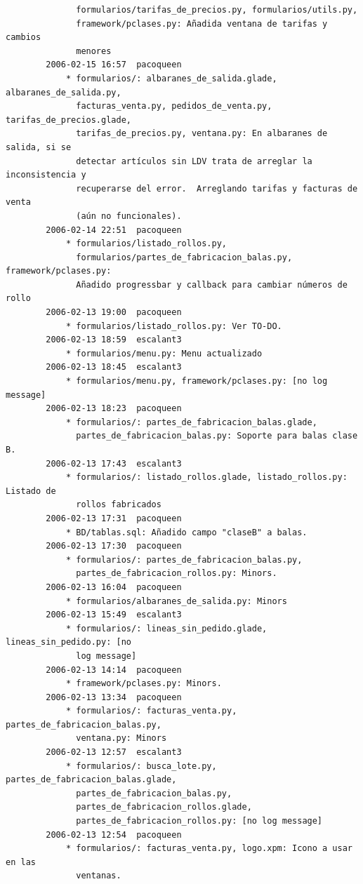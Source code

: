\documentclass[a4paper]{article}
\begin{document}
\begin{verbatim}
              formularios/tarifas_de_precios.py, formularios/utils.py,
              framework/pclases.py: Añadida ventana de tarifas y cambios
              menores
        2006-02-15 16:57  pacoqueen
            * formularios/: albaranes_de_salida.glade, albaranes_de_salida.py,
              facturas_venta.py, pedidos_de_venta.py, tarifas_de_precios.glade,
              tarifas_de_precios.py, ventana.py: En albaranes de salida, si se
              detectar artículos sin LDV trata de arreglar la inconsistencia y
              recuperarse del error.  Arreglando tarifas y facturas de venta
              (aún no funcionales).
        2006-02-14 22:51  pacoqueen
            * formularios/listado_rollos.py,
              formularios/partes_de_fabricacion_balas.py, framework/pclases.py:
              Añadido progressbar y callback para cambiar números de rollo
        2006-02-13 19:00  pacoqueen
            * formularios/listado_rollos.py: Ver TO-DO.
        2006-02-13 18:59  escalant3
            * formularios/menu.py: Menu actualizado
        2006-02-13 18:45  escalant3
            * formularios/menu.py, framework/pclases.py: [no log message]
        2006-02-13 18:23  pacoqueen
            * formularios/: partes_de_fabricacion_balas.glade,
              partes_de_fabricacion_balas.py: Soporte para balas clase B.
        2006-02-13 17:43  escalant3
            * formularios/: listado_rollos.glade, listado_rollos.py: Listado de
              rollos fabricados
        2006-02-13 17:31  pacoqueen
            * BD/tablas.sql: Añadido campo "claseB" a balas.
        2006-02-13 17:30  pacoqueen
            * formularios/: partes_de_fabricacion_balas.py,
              partes_de_fabricacion_rollos.py: Minors.
        2006-02-13 16:04  pacoqueen
            * formularios/albaranes_de_salida.py: Minors
        2006-02-13 15:49  escalant3
            * formularios/: lineas_sin_pedido.glade, lineas_sin_pedido.py: [no
              log message]
        2006-02-13 14:14  pacoqueen
            * framework/pclases.py: Minors.
        2006-02-13 13:34  pacoqueen
            * formularios/: facturas_venta.py, partes_de_fabricacion_balas.py,
              ventana.py: Minors
        2006-02-13 12:57  escalant3
            * formularios/: busca_lote.py, partes_de_fabricacion_balas.glade,
              partes_de_fabricacion_balas.py,
              partes_de_fabricacion_rollos.glade,
              partes_de_fabricacion_rollos.py: [no log message]
        2006-02-13 12:54  pacoqueen
            * formularios/: facturas_venta.py, logo.xpm: Icono a usar en las
              ventanas.

\end{verbatim}
\end{document}
